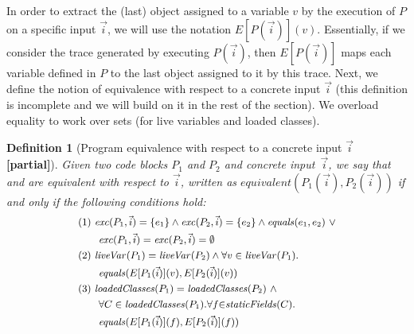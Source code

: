 \documentclass[sigconf]{acmart}
\newtheorem{definition}{Definition}
\begin{document}
In order to extract the (last) object assigned to a variable $v$ by the execution of $P$ on a specific input $\vec{i}$,
we will use the notation $E[P(\vec{i})](v)$. Essentially, if we consider the trace generated by executing $P(\vec{i})$,
then $E[P(\vec{i})]$ maps each variable defined in $P$ to the last object assigned to it by this trace.
Next, we define the notion of equivalence with respect to a concrete input $\vec{i}$ (this definition is incomplete and we will build on it in the rest of the section).
We overload equality to work over sets (for live variables and loaded classes).

\begin{definition}[Program equivalence with respect to a concrete input $\vec{i}$ {\bf[partial]}]\label{def:prog-equiv}
  Given two code blocks $P_1$ and $P_2$ and concrete input~$\vec{i}$,
  we say that  and  are equivalent
  with respect to $\vec{i}$, written as $equivalent(P_1(\vec{i}), P_2(\vec{i}))$
  if and only if the following conditions hold:
%
%
  \[
\small
\begin{aligned}
  & (1)~ \mathit{{exc}}(P_1, \vec{i})=\{e_1\} \wedge \mathit{{exc}}(P_2, \vec{i})=\{e_2\} \wedge \mathit{{equals}}(e_1,e_2) ~\vee\\
  & \qquad \mathit{{exc}}(P_1, \vec{i})=\mathit{{exc}}(P_2, \vec{i}) =\emptyset \\
      & (2)~ \mathit{{liveVar}}(P_1) = \mathit{{liveVar}}(P_2) \wedge \forall v\in \mathit{{liveVar}}(P_1). \\
      & \qquad \mathit{{equals}}(E[P_1(\vec{i})](v), E[P_2(\vec{i})](v))\\
  & (3)~  \mathit{{loadedClasses}}(P_1) = \mathit{{loadedClasses}}(P_2) ~\wedge\\
  & \qquad \forall C \in \mathit{{loadedClasses}}(P_1). \forall f {\in} \mathit{{staticFields}}(C).\\
  & \qquad \mathit{{equals}}(E[P_1(\vec{i})](f), E[P_2(\vec{i})](f))
    \end{aligned}
    \]


  \end{definition}
\end{document}
